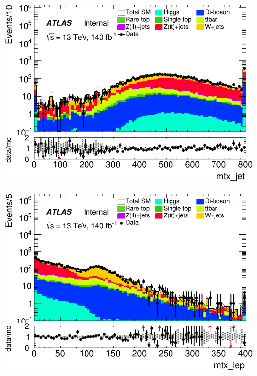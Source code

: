 \documentclass[usenames,dvipsnames]{beamer}
\begin{document}
\begin{frame}
    \begin{minipage}{0.32\textwidth}
        \centering
        \includegraphics[width=\textwidth]{graphics/H_met/H_met_mtx_jet.png}
    \end{minipage}
    \hfill
    \begin{minipage}{0.32\textwidth}
        \centering
        \includegraphics[width=\textwidth]{graphics/H_met/H_met_mtx_lep.png}
    \end{minipage}
    \hfill
    \begin{minipage}{0.32\textwidth}
        \centering

\end{minipage}
\end{frame}
\end{document}
